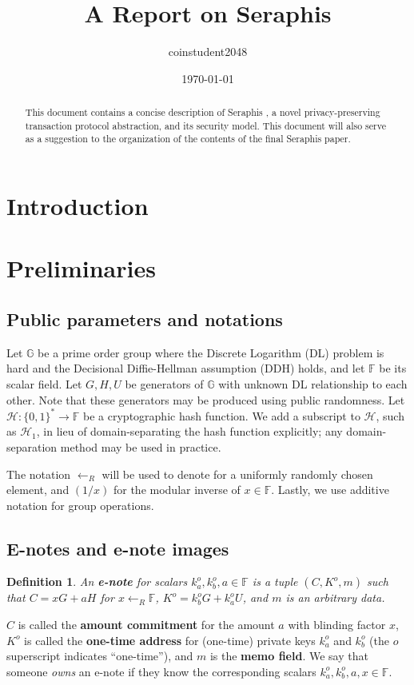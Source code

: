 \documentclass{article}
\title{A Report on Seraphis}
\author{coinstudent2048}
\date{\today}
\newtheorem{definition}{Definition}[section]
\begin{document}
\maketitle

\begin{abstract}
This document contains a concise description of Seraphis \cite{seraphis}, a novel privacy-preserving transaction protocol abstraction, and its security model. This document will also serve as a suggestion to the organization of the contents of the final Seraphis paper.
\end{abstract}

\section{Introduction}

\section{Preliminaries}
\subsection{Public parameters and notations}
\noindent Let $\mathbb{G}$ be a prime order group where the Discrete Logarithm (DL) problem is hard and the Decisional Diffie-Hellman assumption (DDH) holds, and let $\mathbb{F}$ be its scalar field. Let $G, H, U$ be generators of $\mathbb{G}$ with unknown DL relationship to each other. Note that these generators may be produced using public randomness. Let $\mathcal{H}:\{0,1\}^*\rightarrow\mathbb{F}$ be a cryptographic hash function. We add a subscript to $\mathcal{H}$, such as $\mathcal{H}_1$, in lieu of domain-separating the hash function explicitly; any domain-separation method may be used in practice.

The notation $\leftarrow_R$ will be used to denote for a uniformly randomly chosen element, and $(1/x)$ for the modular inverse of $x\in\mathbb{F}$. Lastly, we use additive notation for group operations.

\subsection{E-notes and e-note images}
\begin{definition}\label{e-note}
An \textbf{\em e-note} for scalars $k_a^o, k_b^o, a \in\mathbb{F}$ is a tuple $(C, K^o, m)$ such that $C = x G + a H$ for $x\leftarrow_R\mathbb{F}$, $K^o=k_b^o G + k_a^o U$, and $m$ is an arbitrary data.
\end{definition}
$C$ is called the \textbf{amount commitment} for the amount $a$ with blinding factor $x$, $K^o$ is called the \textbf{one-time address} for (one-time) private keys $k_a^o$ and $k_b^o$ (the $o$ superscript indicates ``one-time''), and $m$ is the \textbf{memo field}. We say that someone \textit{owns} an e-note if they know the corresponding scalars $k_a^o, k_b^o, a, x \in\mathbb{F}$.
\end{document}
